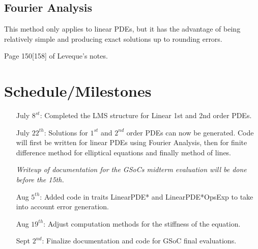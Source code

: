 \subsection{Fourier Analysis}
This method only applies to linear PDEs, but it has the advantage of
being relatively simple and producing exact solutions up to rounding
errors.

Page 150[158] of Leveque's notes.  

\section{Schedule/Milestones}
\begin{itemize}
\item[July $8^{st}$:] Completed the LMS structure for Linear 1st
    and 2nd order PDEs. 
\item[July $22^{th}$:] Solutions for $1^{st}$ and $2^{nd}$ order
    PDEs can now be generated. Code will first be written for linear
    PDEs using Fourier Analysis, then for finite difference method for
    elliptical equations and finally method of lines.  
    
    \emph{Writeup of documentation for the GSoCs midterm evaluation
        will be done before the 15th.}
    
\item[Aug $5^{th}$:] Added code in traits LinearPDE* and
    LinearPDE*OpsExp to take into account error generation.
    
\item[Aug $19^{th}$:] Adjust computation methods for the stiffness of
    the equation. 
    
\item[Sept $2^{nd}$:] Finalize documentation and code for GSoC final evaluations.
\end{itemize}


